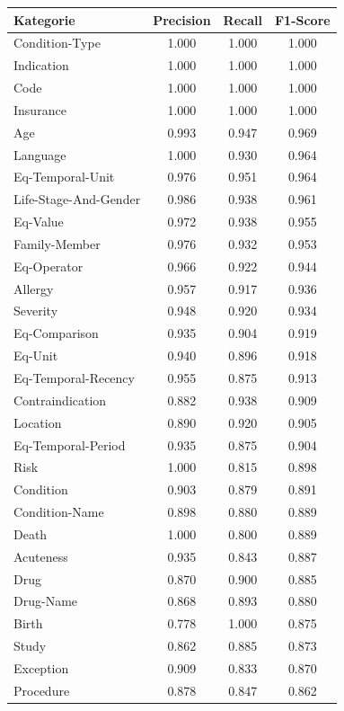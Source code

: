 \begin{table}[htbp]
\centering
\begin{tabular}{p{5cm}ccc}
\toprule
\textbf{Kategorie} & \textbf{Precision} & \textbf{Recall} & \textbf{F1-Score} \\
\midrule
Condition-Type & 1.000 & 1.000 & 1.000 \\
Indication & 1.000 & 1.000 & 1.000 \\
Code & 1.000 & 1.000 & 1.000 \\
Insurance & 1.000 & 1.000 & 1.000 \\
Age & 0.993 & 0.947 & 0.969 \\
Language & 1.000 & 0.930 & 0.964 \\
Eq-Temporal-Unit & 0.976 & 0.951 & 0.964 \\
Life-Stage-And-Gender & 0.986 & 0.938 & 0.961 \\
Eq-Value & 0.972 & 0.938 & 0.955 \\
Family-Member & 0.976 & 0.932 & 0.953 \\
Eq-Operator & 0.966 & 0.922 & 0.944 \\
Allergy & 0.957 & 0.917 & 0.936 \\
Severity & 0.948 & 0.920 & 0.934 \\
Eq-Comparison & 0.935 & 0.904 & 0.919 \\
Eq-Unit & 0.940 & 0.896 & 0.918 \\
Eq-Temporal-Recency & 0.955 & 0.875 & 0.913 \\
Contraindication & 0.882 & 0.938 & 0.909 \\
Location & 0.890 & 0.920 & 0.905 \\
Eq-Temporal-Period & 0.935 & 0.875 & 0.904 \\
Risk & 1.000 & 0.815 & 0.898 \\
Condition & 0.903 & 0.879 & 0.891 \\
Condition-Name & 0.898 & 0.880 & 0.889 \\
Death & 1.000 & 0.800 & 0.889 \\
Acuteness & 0.935 & 0.843 & 0.887 \\
Drug & 0.870 & 0.900 & 0.885 \\
Drug-Name & 0.868 & 0.893 & 0.880 \\
Birth & 0.778 & 1.000 & 0.875 \\
Study & 0.862 & 0.885 & 0.873 \\
Exception & 0.909 & 0.833 & 0.870 \\
Procedure & 0.878 & 0.847 & 0.862 \\

\end{tabular}
\end{table}
